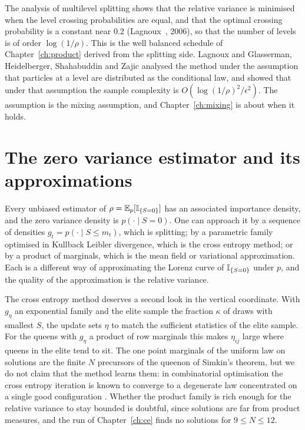 The analysis of multilevel splitting shows that the relative variance is minimised when the level crossing probabilities are equal, and that the optimal crossing probability is a constant near $0.2$ (Lagnoux~\cite{Lagnoux}, 2006), so that the number of levels is of order $\log(1/\rho)$. This is the well balanced schedule of Chapter~\ref{ch:product} derived from the splitting side. Lagnoux and Glasserman, Heidelberger, Shahabuddin and Zajic analysed the method under the assumption that particles at a level are distributed as the conditional law, and showed that under that assumption the sample complexity is $O(\log(1/\rho)^2 / \epsilon^2)$. The assumption is the mixing assumption, and Chapter~\ref{ch:mixing} is about when it holds.

\section{The zero variance estimator and its approximations}

Every unbiased estimator of $\rho = \mathbb{E}_p[\mathbb{I}_{\{S = 0\}}]$ has an associated importance density, and the zero variance density is $p(\cdot \mid S = 0)$. One can approach it by a sequence of densities $g_t = p(\cdot \mid S \le m_t)$, which is splitting; by a parametric family optimised in Kullback Leibler divergence, which is the cross entropy method; or by a product of marginals, which is the mean field or variational approximation. Each is a different way of approximating the Lorenz curve of $\mathbb{I}_{\{S=0\}}$ under $p$, and the quality of the approximation is the relative variance.

The cross entropy method deserves a second look in the vertical coordinate. With $g_\eta$ an exponential family and the elite sample the fraction $\kappa$ of draws with smallest $S$, the update sets $\eta$ to match the sufficient statistics of the elite sample. For the queens with $g_\eta$ a product of row marginals this makes $\eta_{ij}$ large where queens in the elite tend to sit. The one point marginals of the uniform law on solutions are the finite $N$ precursors of the queenon of Simkin's theorem, but we do not claim that the method learns them: in combinatorial optimisation the cross entropy iteration is known to converge to a degenerate law concentrated on a single good configuration \cite{RubinsteinKroeseCE}. Whether the product family is rich enough for the relative variance to stay bounded is doubtful, since solutions are far from product measures, and the run of Chapter~\ref{ch:ce} finds no solutions for $9 \le N \le 12$.


